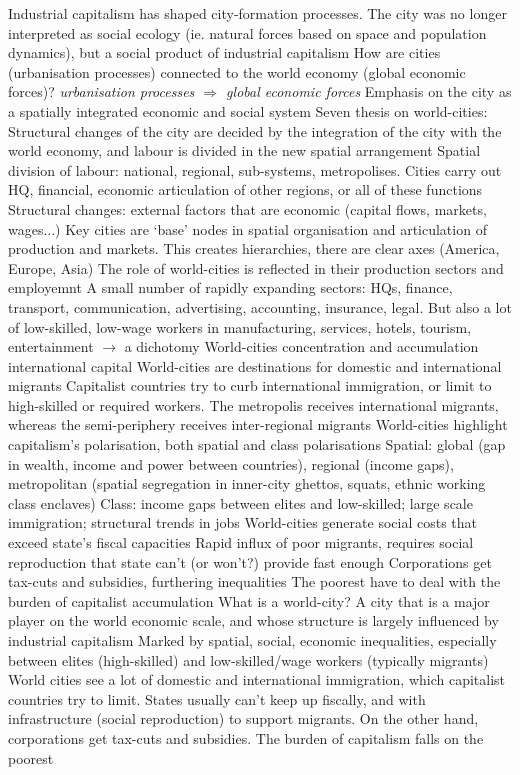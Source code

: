 \documentclass{article}
\begin{document}
\begin{outline}
	\1 Industrial capitalism has shaped city-formation processes. The city was no longer interpreted as social ecology (ie. natural forces based on space and population dynamics), but a social product of industrial capitalism
	\1 How are cities (urbanisation processes) connected to the world economy (global economic forces)? \textit{urbanisation processes $\Rightarrow$ global economic forces}
	\1 Emphasis on the city as a spatially integrated economic and social system
	\1 Seven thesis on world-cities:
		\2 Structural changes of the city are decided by the integration of the city with the world economy, and labour is divided in the new spatial arrangement
			\3 Spatial division of labour: national, regional, sub-systems, metropolises. Cities carry out HQ, financial, economic articulation of other regions, or all of these functions
			\3 Structural changes: external factors that are economic (capital flows, markets, wages...)
		\2 Key cities are `base' nodes in spatial organisation and articulation of production and markets. This creates hierarchies, there are clear axes (America, Europe, Asia)
		\2 The role of world-cities is reflected in their production sectors and employemnt
			\3 A small number of rapidly expanding sectors: HQs, finance, transport, communication, advertising, accounting, insurance, legal. But also a lot of low-skilled, low-wage workers in manufacturing, services, hotels, tourism, entertainment $\rightarrow$ a dichotomy
		\2 World-cities concentration and accumulation international capital
		\2 World-cities are destinations for domestic and international migrants
			\3 Capitalist countries try to curb international immigration, or limit to high-skilled or required workers. The metropolis receives international migrants, whereas the semi-periphery receives inter-regional migrants
		\2 World-cities highlight capitalism's polarisation, both spatial and class polarisations
			\3 Spatial: global (gap in wealth, income and power between countries), regional (income gaps), metropolitan (spatial segregation in inner-city ghettos, squats, ethnic working class enclaves)
			\3 Class: income gaps between elites and low-skilled; large scale immigration; structural trends in jobs
		\2 World-cities generate social costs that exceed state's fiscal capacities
			\3 Rapid influx of poor migrants, requires social reproduction that state can't (or won't?) provide fast enough
			\3 Corporations get tax-cuts and subsidies, furthering inequalities
			\3 The poorest have to deal with the burden of capitalist accumulation
	\1 What is a world-city?
		\2 A city that is a major player on the world economic scale, and whose structure is largely influenced by industrial capitalism
		\2 Marked by spatial, social, economic inequalities, especially between elites (high-skilled) and low-skilled/wage workers (typically migrants)
		\2 World cities see a lot of domestic and international immigration, which capitalist countries try to limit. States usually can't keep up fiscally, and with infrastructure (social reproduction) to support migrants.
		On the other hand, corporations get tax-cuts and subsidies. The burden of capitalism falls on the poorest
\end{outline}
\end{document}
